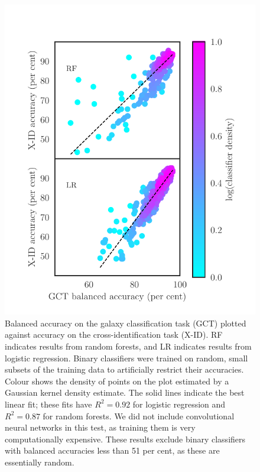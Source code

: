 \documentclass[fleqn,usenatbib,usedcolumn]{mnras}
\begin{document}
    \begin{figure}
      \centering
      \includegraphics[width=\columnwidth]{images/gct-to-xid.pdf}
      \caption{Balanced accuracy on the galaxy classification task (GCT) plotted
      against accuracy on the cross-identification task (X-ID). RF indicates
      results from random forests, and LR indicates results from logistic
      regression. Binary classifiers were trained on random, small subsets of the
      training data to artificially restrict their accuracies. Colour shows
      the density of points on the plot estimated by a Gaussian kernel density
      estimate. The solid lines indicate the best linear fit; these fits have
      $R^2 = 0.92$ for logistic regression and $R^2 = 0.87$ for random
      forests. We did not include convolutional neural networks in this test,
      as training them is very computationally expensive. These results
      exclude binary classifiers with balanced accuracies less than 51 per cent, as
      these are essentially random.
      \label{fig:gct-to-xid}}
    \end{figure}
\end{document}
